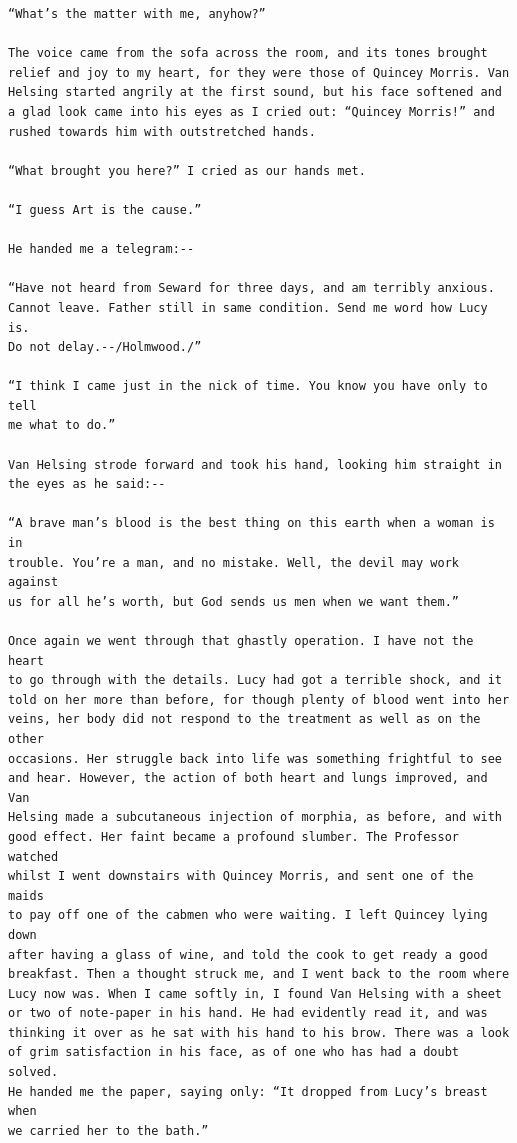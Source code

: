 \documentclass{article}
\begin{document}
\begin{verbatim}
“What’s the matter with me, anyhow?”

The voice came from the sofa across the room, and its tones brought
relief and joy to my heart, for they were those of Quincey Morris. Van
Helsing started angrily at the first sound, but his face softened and
a glad look came into his eyes as I cried out: “Quincey Morris!” and
rushed towards him with outstretched hands.

“What brought you here?” I cried as our hands met.

“I guess Art is the cause.”

He handed me a telegram:--

“Have not heard from Seward for three days, and am terribly anxious.
Cannot leave. Father still in same condition. Send me word how Lucy is.
Do not delay.--/Holmwood./”

“I think I came just in the nick of time. You know you have only to tell
me what to do.”

Van Helsing strode forward and took his hand, looking him straight in
the eyes as he said:--

“A brave man’s blood is the best thing on this earth when a woman is in
trouble. You’re a man, and no mistake. Well, the devil may work against
us for all he’s worth, but God sends us men when we want them.”

Once again we went through that ghastly operation. I have not the heart
to go through with the details. Lucy had got a terrible shock, and it
told on her more than before, for though plenty of blood went into her
veins, her body did not respond to the treatment as well as on the other
occasions. Her struggle back into life was something frightful to see
and hear. However, the action of both heart and lungs improved, and Van
Helsing made a subcutaneous injection of morphia, as before, and with
good effect. Her faint became a profound slumber. The Professor watched
whilst I went downstairs with Quincey Morris, and sent one of the maids
to pay off one of the cabmen who were waiting. I left Quincey lying down
after having a glass of wine, and told the cook to get ready a good
breakfast. Then a thought struck me, and I went back to the room where
Lucy now was. When I came softly in, I found Van Helsing with a sheet
or two of note-paper in his hand. He had evidently read it, and was
thinking it over as he sat with his hand to his brow. There was a look
of grim satisfaction in his face, as of one who has had a doubt solved.
He handed me the paper, saying only: “It dropped from Lucy’s breast when
we carried her to the bath.”


\end{verbatim}
\end{document}
